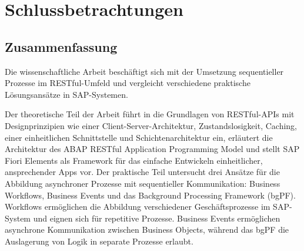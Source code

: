 \chapter{Schlussbetrachtungen}


\section{Zusammenfassung}

Die wissenschaftliche Arbeit beschäftigt sich mit der Umsetzung sequentieller Prozesse im RESTful-Umfeld und vergleicht verschiedene praktische Lösungsansätze in SAP-Systemen. 

Der theoretische Teil der Arbeit führt in die Grundlagen von RESTful-APIs mit Designprinzipien wie einer Client-Server-Architektur, Zustandslosigkeit, Caching, einer einheitlichen Schnittstelle und Schichtenarchitektur ein, erläutert die Architektur des ABAP RESTful Application Programming Model und stellt SAP Fiori Elements als Framework für das einfache Entwickeln einheitlicher, ansprechender Apps vor. \newline
Der praktische Teil untersucht drei Ansätze für die Abbildung asynchroner Prozesse mit sequentieller Kommunikation: Business Workflows, Business Events und das Background Processing Framework (bgPF). Workflows ermöglichen die Abbildung verschiedener Geschäftsprozesse im SAP-System und eignen sich für repetitive Prozesse. Business Events ermöglichen asynchrone Kommunikation zwischen Business Objects, während das bgPF die Auslagerung von Logik in separate Prozesse erlaubt.

